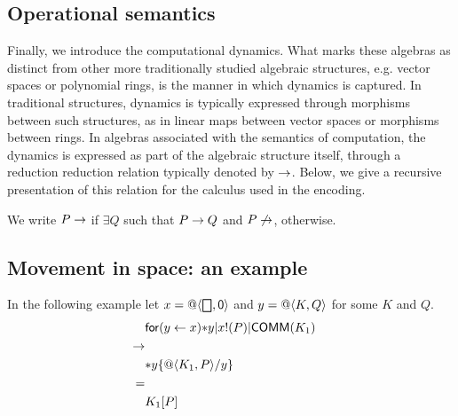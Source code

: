 \subsection{Operational semantics}

Finally, we introduce the computational dynamics. What marks these
algebras as distinct from other more traditionally studied algebraic
structures, e.g. vector spaces or polynomial rings, is the manner in
which dynamics is captured. In traditional structures, dynamics is typically
expressed through morphisms between such structures, as in linear maps
between vector spaces or morphisms between rings. In algebras
associated with the semantics of computation, the dynamics is
expressed as part of the algebraic structure itself, through a
reduction reduction relation typically denoted by $\red$. Below, we
give a recursive presentation of this relation for the calculus used
in the encoding.


We write $P\red$ if $\exists Q $ such that $ P \red Q$ and $P\not\red$, otherwise.

\subsection{ Movement in space: an example }
In the following example let $x = \spacen{\bigbox}{\pzero}$ and $y = \spacen{K}{Q}$ for some $K$ and $Q$.
\begin{eqnarray*}
  & \binpar{\binpar{\prefix{x}{y}{\dropn{y}}}{\outputp{x}{P}}}{\mathsf{COMM}(K_{1})} & \\
  \red & & \\
  & \dropn{y}\substn{\spacen{K_{1}}{P}}{y} & \\
  = & & \\
  & K_{1}[P] &
\end{eqnarray*}

